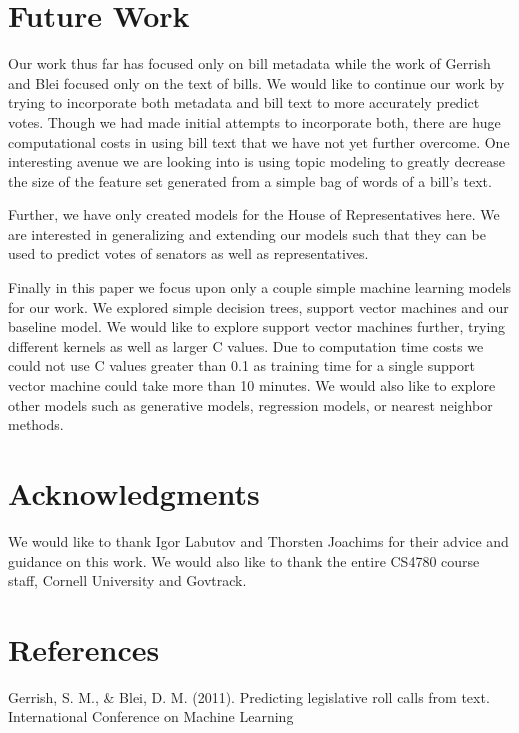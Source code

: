\documentclass[11pt,letterpaper,twocolumn]{article}
\begin{document}
\section{Future Work}

Our work thus far has focused only on bill metadata while the work of Gerrish and Blei focused only on the text of bills. We would like to continue our work by trying to incorporate both metadata and bill text to more accurately predict votes. Though we had made initial attempts to incorporate both, there are huge computational costs in using bill text that we have not yet further overcome. One interesting avenue we are looking into is using topic modeling to greatly decrease the size of the feature set generated from a simple bag of words of a bill's text.

Further, we have only created models for the House of Representatives here. We are interested in generalizing and extending our models such that they can be used to predict votes of senators as well as representatives. 

Finally in this paper we focus upon only a couple simple machine learning models for our work. We explored simple decision trees, support vector machines and our baseline model. We would like to explore support vector machines further, trying different kernels as well as larger C values. Due to computation time costs we could not use C values greater than 0.1 as training time for a single support vector machine could take more than 10 minutes. We would also like to explore other models such as generative models, regression models, or nearest neighbor methods.

\section*{Acknowledgments}

We would like to thank Igor Labutov and Thorsten Joachims for their advice and guidance on this work. We would also like to thank the entire CS4780 course staff, Cornell University and Govtrack. 

\pagebreak

\section*{References}

Gerrish, S. M., \& Blei, D. M. (2011). Predicting legislative roll calls from text. International Conference on Machine Learning
\end{document}

